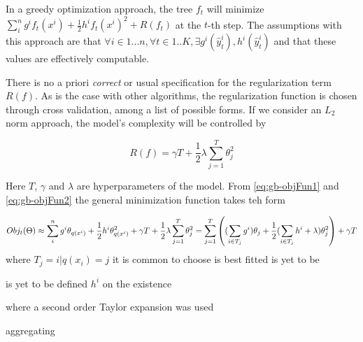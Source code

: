 In a greedy optimization approach, the tree $f_t$ will minimize $\sum_i^n {  g^i f_t(x^i) + \frac{1}{2} h^i f_t(x^i)^2 } + R(f_t)$ at the $t$-th step. The assumptions with this approach are that $ \forall i \in {1...n}, \forall t \in {1..K}, \exists g^i(\hat{y}_{t}^i), h^i(\hat{y}_{t}^i) $ and that these values are effectively computable.

There is no a priori \textit{correct} or usual specification for the regularization term $R(f)$. As is the case with other algorithms, the regularization function is chosen through cross validation, among a list of possible forms. If we consider an $L_2$ norm approach, the model's complexity will be controlled by 

\begin{equation} \label{eq:gb-objFun2}
R(f) =  \gamma T + \frac{1}{2}\lambda \sum_{j=1}^T\theta_j^2 
\end{equation}

Here $T$, $\gamma$ and $\lambda$ are hyperparameters of the model. From \ref{eq:gb-objFun1} and \ref{eq:gb-objFun2} the general minimization function takes teh form

\begin{equation} \label{eq:gb-objFun}

    Obj_t(\Theta) \approx  \sum_i^n {g^i \theta_{q(x^i)} + \frac{1}{2} h^i \theta_{q(x^i)}^2 } + \gamma T 
        + \frac{1}{2}\lambda \sum_{j=1}^T\theta_j^2 \\
          =   \sum_{j=1}^T\left(  (\sum_{i \in T_j} g^i )\theta_{j} + \frac{1}{2} (\sum_{i \in T_j} h^i + \lambda ) \theta_{j}^2  \right) + \gamma T \\
\end{equation}
where $T_j = {i | q(x_i)= j}$
it is common to choose is best fitted
is yet to be 

is  yet to be defined
$h^i$ on the existence 

where a second order Taylor expansion was used 

aggregating 








